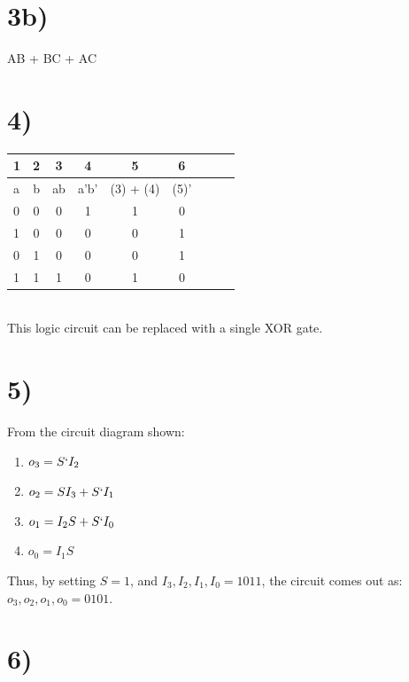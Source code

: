\documentclass[a4paper,11pt]{article}
\begin{document}
\section*{3b)}
AB + BC + AC


\section*{4)}
\begin{tabular}{| l | c | c | c | c | c | c | c | c |}
  \hline	
    1 & 2 & 3 & 4 & 5 & 6  \\  \hline \hline
    a & b & ab & a'b'& (3) + (4) & (5)'  \\  \hline \hline
    0 & 0 & 0 & 1 & 1 & 0   \\  \hline 
    1 & 0 & 0 & 0 & 0 & 1   \\  \hline 
    0 & 1 & 0 & 0 & 0 & 1   \\  \hline 
    1 & 1 & 1 & 0 & 1 & 0   \\  \hline 
\end{tabular} \\

\noindent This logic circuit can be replaced with a single XOR gate.


\section*{5)}
From the circuit diagram shown:

\begin{enumerate}
  \item $o_3 = S`I_2$
  \item $o_2 = SI_3 + S`I_1$
  \item $o_1 = I_2S + S`I_0$
  \item $o_0 = I_1S$
\end{enumerate}

\noindent Thus, by setting $S=1$, and $I_3, I_2 , I_1, I_0 = 1011$, the circuit comes out as: $o_3, o_2, o_1, o_0 = 0101$.


\section*{6)}
\end{document}
